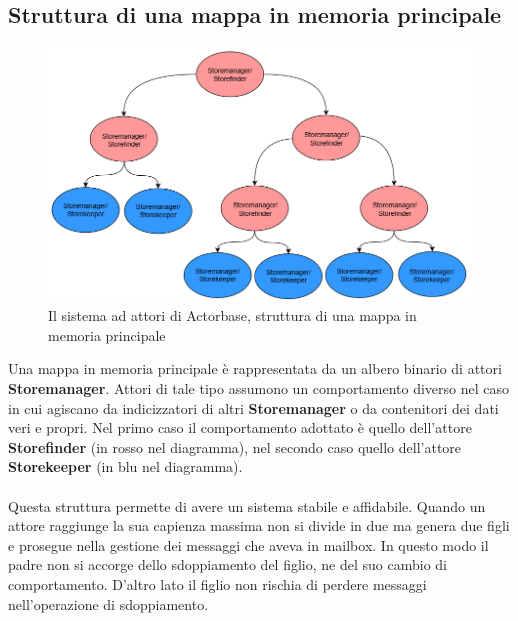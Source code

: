 \documentclass[a4paper]{article}
\begin{document}
	\subsection{Struttura di una mappa in memoria principale}
					\begin{figure}[H]
					\centering
					\includegraphics[width=\textwidth]{immagini/ST/map}
					\caption{Il sistema ad attori di Actorbase, struttura di una mappa in memoria principale}
				\end{figure}
Una mappa in memoria principale è rappresentata da un albero binario di attori \textbf{Storemanager}. Attori di tale tipo assumono un comportamento diverso nel caso in cui agiscano da indicizzatori di altri \textbf{Storemanager} o da contenitori dei dati veri e propri. Nel primo caso il comportamento adottato è quello dell'attore \textbf{Storefinder} (in rosso nel diagramma), nel secondo caso quello dell'attore \textbf{Storekeeper} (in blu nel diagramma).
\\ \\
Questa struttura permette di avere un sistema stabile e affidabile. Quando un attore raggiunge la sua capienza massima non si divide in due ma genera due figli e prosegue nella gestione dei messaggi che aveva in mailbox. In questo modo il padre non si accorge dello sdoppiamento del figlio, ne del suo cambio di comportamento. D'altro lato il figlio non rischia di perdere messaggi nell'operazione di sdoppiamento.
\end{document}
